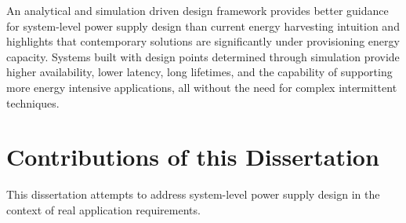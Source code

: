 

An analytical and simulation driven design framework provides better guidance for system-level power supply design than current energy harvesting intuition and highlights that contemporary solutions are significantly under provisioning energy capacity. 
Systems built with design points determined through simulation provide higher availability, lower latency, long lifetimes, and the capability of supporting more energy intensive applications, all without the need for complex intermittent techniques.

\the\textwidth

\section{Contributions of this Dissertation}
This dissertation attempts to address system-level power supply design in the context of real application requirements.


